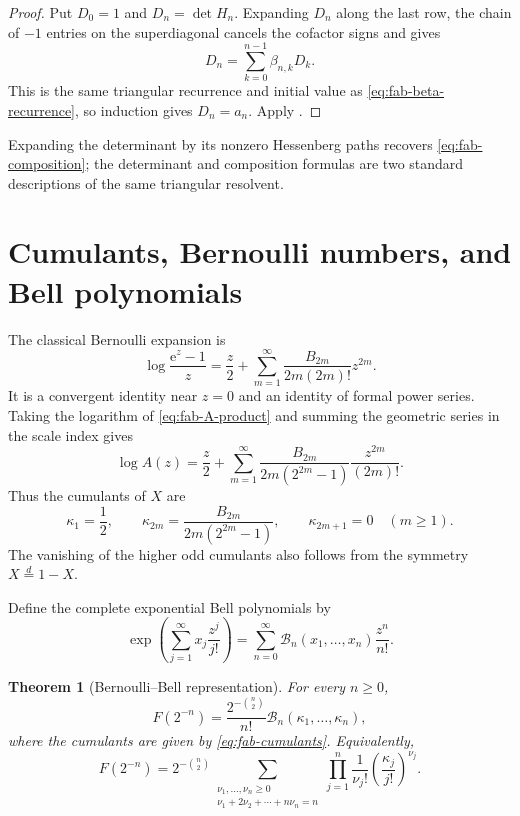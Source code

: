 \documentclass[11pt,oneside,openany]{book}
\newtheorem{theorem}{Theorem}[chapter]
\theoremstyle{definition}
\theoremstyle{remark}
\newcommand{\e}{\mathrm e}
\begin{document}
\begin{proof}
Put $D_0=1$ and $D_n=\det H_n$.  Expanding $D_n$ along the last row, the chain of $-1$ entries on the superdiagonal cancels the cofactor signs and gives
\[
 D_n=\sum_{k=0}^{n-1}\beta_{n,k}D_k.
\]
This is the same triangular recurrence and initial value as \eqref{eq:fab-beta-recurrence}, so induction gives $D_n=a_n$.  Apply .
\end{proof}

Expanding the determinant by its nonzero Hessenberg paths recovers \eqref{eq:fab-composition}; the determinant and composition formulas are two standard descriptions of the same triangular resolvent.

\section{Cumulants, Bernoulli numbers, and Bell polynomials}

The classical Bernoulli expansion is
\begin{equation}
 \log\frac{\e^z-1}{z}
 =\frac z2+\sum_{m=1}^{\infty}
   \frac{B_{2m}}{2m(2m)!}z^{2m}.
 \label{eq:fab-log-Phi}
\end{equation}
It is a convergent identity near $z=0$ and an identity of formal power series.  Taking the logarithm of \eqref{eq:fab-A-product} and summing the geometric series in the scale index gives
\begin{equation}
 \log A(z)=\frac z2+\sum_{m=1}^{\infty}
 \frac{B_{2m}}{2m(2^{2m}-1)}\frac{z^{2m}}{(2m)!}.
 \label{eq:fab-log-A}
\end{equation}
Thus the cumulants of $X$ are
\begin{equation}
 \kappa_1=\frac12,
 \qquad
 \kappa_{2m}=\frac{B_{2m}}{2m(2^{2m}-1)},
 \qquad
 \kappa_{2m+1}=0\quad(m\ge1).
 \label{eq:fab-cumulants}
\end{equation}
The vanishing of the higher odd cumulants also follows from the symmetry $X\overset d=1-X$.

Define the complete exponential Bell polynomials by
\begin{equation}
 \exp\!\left(\sum_{j=1}^{\infty}x_j\frac{z^j}{j!}\right)
 =\sum_{n=0}^{\infty}\mathcal B_n(x_1,\ldots,x_n)\frac{z^n}{n!}.
 \label{eq:fab-Bell-definition}
\end{equation}

\begin{theorem}[Bernoulli--Bell representation]\label{thm:fab-Bell}
For every $n\ge0$,
\begin{equation}
 \boxed{
 F(2^{-n})=\frac{2^{-\binom n2}}{n!}
 \mathcal B_n(\kappa_1,\ldots,\kappa_n),}
 \label{eq:fab-Bell}
\end{equation}
where the cumulants are given by \eqref{eq:fab-cumulants}.  Equivalently,
\begin{equation}
 F(2^{-n})=2^{-\binom n2}
 \sum_{\substack{\nu_1,\ldots,\nu_n\ge0\\
                  \nu_1+2\nu_2+\cdots+n\nu_n=n}}
 \prod_{j=1}^n\frac1{\nu_j!}
 \left(\frac{\kappa_j}{j!}\right)^{\nu_j}.
 \label{eq:fab-cumulant-partition}
\end{equation}
\end{theorem}
\end{document}
